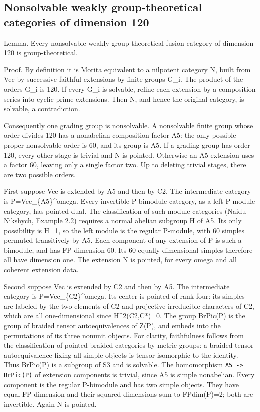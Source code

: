 \hypertarget{nonsolvable-weakly-group-theoretical-categories-of-dimension-120}{%
\subsection{Nonsolvable weakly group-theoretical categories of dimension
120}\label{nonsolvable-weakly-group-theoretical-categories-of-dimension-120}}

Lemma. Every nonsolvable weakly group-theoretical fusion category of
dimension 120 is group-theoretical.

Proof. By definition it is Morita equivalent to a nilpotent category N,
built from Vec by successive faithful extensions by finite groups G\_i.
The product of the orders \textbar G\_i\textbar{} is 120. If every G\_i
is solvable, refine each extension by a composition series into
cyclic-prime extensions. Then N, and hence the original category, is
solvable, a contradiction.

Consequently one grading group is nonsolvable. A nonsolvable finite
group whose order divides 120 has a nonabelian composition factor A5:
the only possible proper nonsolvable order is 60, and its group is A5.
If a grading group has order 120, every other stage is trivial and N is
pointed. Otherwise an A5 extension uses a factor 60, leaving only a
single factor two. Up to deleting trivial stages, there are two possible
orders.

First suppose Vec is extended by A5 and then by C2. The intermediate
category is P=Vec\_\{A5\}\^{}omega. Every invertible P-bimodule
category, as a left P-module category, has pointed dual. The
classification of such module categories (Naidu--Nikshych, Example 2.2)
requires a normal abelian subgroup H of A5. Its only possibility is H=1,
so the left module is the regular P-module, with 60 simples permuted
transitively by A5. Each component of any extension of P is such a
bimodule, and has FP dimension 60. Its 60 equally dimensional simples
therefore all have dimension one. The extension N is pointed, for every
omega and all coherent extension data.

Second suppose Vec is extended by C2 and then by A5. The intermediate
category is P=Vec\_\{C2\}\^{}omega. Its center is pointed of rank four:
its simples are labeled by the two elements of C2 and projective
irreducible characters of C2, which are all one-dimensional since
H\^{}2(C2,C*)=0. The group BrPic(P) is the group of braided tensor
autoequivalences of Z(P), and embeds into the permutations of its three
nonunit objects. For clarity, faithfulness follows from the
classification of pointed braided categories by metric groups: a braided
tensor autoequivalence fixing all simple objects is tensor isomorphic to
the identity. Thus BrPic(P) is a subgroup of S3 and is solvable. The
homomorphism \texttt{A5 -\allowbreak{}> BrPi\allowbreak{}c(P)} of
extension components is trivial, since A5 is simple nonabelian. Every
component is the regular P-bimodule and has two simple objects. They
have equal FP dimension and their squared dimensions sum to FPdim(P)=2;
both are invertible. Again N is pointed.

